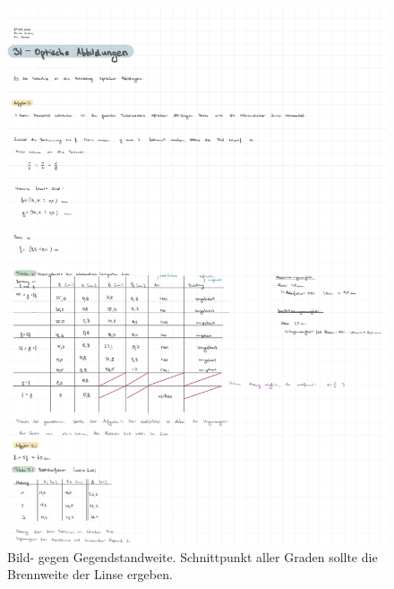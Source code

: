 \begin{figure}[h!]
    \centering
    \includegraphics[width=\textwidth, page=5]{Protokolle/31/Chapter/Messprotokoll.pdf}
    \caption{Bild- gegen Gegendstandweite. Schnittpunkt aller Graden sollte die Brennweite der Linse ergeben.}
    \label{fig:auswertung_achromat2}
\end{figure}

